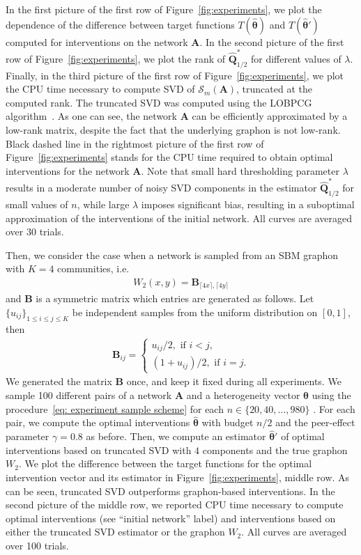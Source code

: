 \documentclass[11pt]{article}
\newcommand{\bA}{\bm{A}}
\newcommand{\bB}{\bm{B}}
\newcommand{\bQ}{\bm{Q}}
\newcommand{\btheta}{\bm{\theta}}
\newcommand{\<}{\langle}
\renewcommand{\>}{\rangle}
\newcommand{\cS}{\mathcal{S}}
\theoremstyle{plain}
\theoremstyle{definition}
\theoremstyle{remark}
\begin{document}
In the first picture of the first row of Figure~\ref{fig:experiments}, we plot the dependence of the difference between target functions $T(\widehat{\btheta})$ and $T(\widehat{\btheta}')$ computed for interventions on the network $\bA$. In the second picture of the first row of Figure~\ref{fig:experiments}, we plot the rank of $\widehat{\bQ}^*_{1/2}$ for different values of $\lambda$. Finally, in the third picture of the first row of Figure~\ref{fig:experiments}, we plot the CPU time necessary to compute SVD of $\cS_m(\bA)$, truncated at the computed rank. The truncated SVD was computed using the LOBPCG algorithm~\citep{knyazev2001toward}. As one can see, the network $\bA$ can be efficiently approximated by a low-rank matrix, despite the fact that the underlying graphon is not low-rank. Black dashed line in the rightmost picture of the first row of Figure~\ref{fig:experiments} stands for the CPU time required to obtain optimal interventions for the network $\bA$. Note that small hard thresholding parameter $\lambda$ results in a moderate number of noisy SVD components in the estimator $\widehat{\bQ}_{1/2}^*$ for small values of $n$, while large $\lambda$ imposes significant bias, resulting in a suboptimal approximation of the interventions of the initial network. All curves are averaged over 30 trials.


 Then, we consider the case when a network is sampled from an SBM graphon with $K = 4$ communities, i.e.
 \begin{align*}
     W_2(x, y) = \bB_{\lceil 4x \rceil, \lceil 4y \rceil}
 \end{align*}
 and $\bB$ is a symmetric matrix which entries are generated as follows. Let $\{u_{ij}\}_{1 \le i \le j \le K}$ be independent samples from the uniform distribution on $[0, 1]$, then
 \begin{align*}
     \bB_{ij} = \begin{cases}
         u_{ij} / 2, \text{ if } i < j, \\
         (1 + u_{ij}) / 2, \text{ if } i = j.
     \end{cases}
 \end{align*}
 We generated the matrix $\bB$ once, and keep it fixed during all experiments. We sample 100 different pairs of a network $\bA$  and a heterogeneity vector $\btheta$ using the procedure~\eqref{eq: experiment sample scheme} for each $n \in \{20, 40, \ldots, 980\}$ . For each pair, we compute the optimal interventions $\widehat{\btheta}$ with budget $n/2$ and the peer-effect parameter $\gamma = 0.8$ as before. Then, we compute an estimator $\widehat{\btheta}'$ of optimal interventions based on truncated SVD with $4$ components and the true graphon $W_2$. We plot the difference between the target functions for the optimal intervention vector and its estimator in Figure~\ref{fig:experiments}, middle row. As can be seen, truncated SVD outperforms graphon-based interventions. In the second picture of the middle row, we reported CPU time necessary to compute optimal interventions (see ``initial network'' label) and interventions based on either the truncated SVD estimator or the graphon $W_2$. All curves are averaged over 100 trials.
\end{document}

